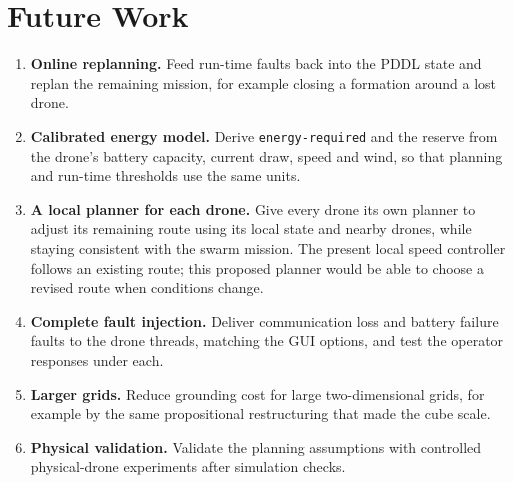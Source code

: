 \documentclass[11pt,a4paper,oneside]{report}
\newcommand{\code}[1]{\texttt{#1}}
\begin{document}
\section{Future Work}
\begin{enumerate}
  \item \textbf{Online replanning.} Feed run-time faults back into the PDDL state and replan the
        remaining mission, for example closing a formation around a lost drone.
  \item \textbf{Calibrated energy model.} Derive \code{energy-required} and the reserve from the
        drone's battery capacity, current draw, speed and wind, so that planning and run-time
        thresholds use the same units.
  \item \textbf{A local planner for each drone.} Give every drone its own planner
        to adjust its remaining route using its local state and nearby drones,
        while staying consistent with the swarm mission. The present local speed
        controller follows an existing route; this proposed planner would be able
        to choose a revised route when conditions change.
  \item \textbf{Complete fault injection.} Deliver communication loss and battery failure faults
        to the drone threads, matching the GUI options, and test the operator responses under
        each.
  \item \textbf{Larger grids.} Reduce grounding cost for large two-dimensional grids, for example
        by the same propositional restructuring that made the cube scale.
  \item \textbf{Physical validation.} Validate the planning assumptions with controlled
        physical-drone experiments after simulation checks.
\end{enumerate}
\end{document}
